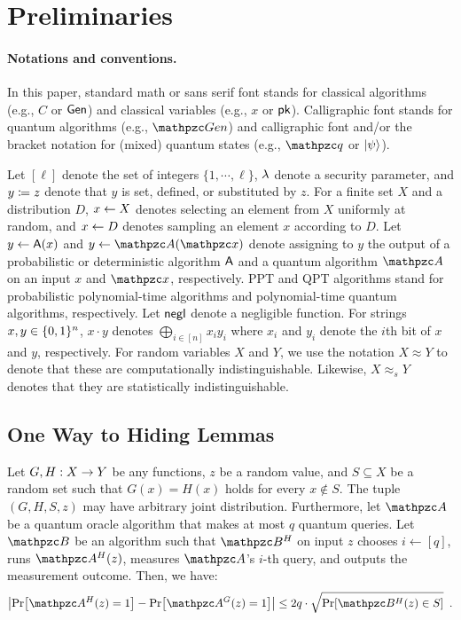 
\section{Preliminaries}\label{sec:prelim}
\ifnum{}
\else
\paragraph{Notations and conventions.}
In this paper, standard math or sans serif font stands for classical algorithms (e.g., $C$ or $\mathsf{Gen}$) and classical variables (e.g., $x$ or $\mathsf{pk}$).
Calligraphic font stands for quantum algorithms (e.g., $\qalgo{Gen}$) and calligraphic font and/or the bracket notation for (mixed) quantum states (e.g., $\qstate{q}$ or $\ket{\psi}$).

Let $[\ell]$ denote the set of integers $\{1, \cdots, \ell \}$, $\lambda$ denote a security parameter, and $y \coloneqq z$ denote that $y$ is set, defined, or substituted by $z$.
For a finite set $X$ and a distribution $D$, $x \leftarrow X$ denotes selecting an element from $X$ uniformly at random, and $x \leftarrow D$ denotes sampling an element $x$ according to $D$. Let $y \leftarrow \mathsf{A}(x)$ and $y \gets \qalgo{A}(\qstate{x})$ denote assigning to $y$ the output of a probabilistic or deterministic algorithm $\mathsf{A}$ and a quantum algorithm $\qalgo{A}$ on an input $x$ and $\qstate{x}$, respectively.
PPT and QPT algorithms stand for probabilistic polynomial-time algorithms and polynomial-time quantum algorithms, respectively.
Let ${\mathsf{negl}}$ denote a negligible function.
For strings $x,y\in \{0,1\}^n$, $x\cdot y$ denotes $\bigoplus_{i\in[n]} x_i y_i$ where $x_i$ and $y_i$ denote the $i$th bit of $x$ and $y$, respectively.
For random variables $X$ and $Y$, we use the notation $X \approx Y$ to denote that these are computationally indistinguishable. Likewise, $X \approx_s Y$ denotes that they are statistically indistinguishable.
\fi


\subsection{One Way to Hiding Lemmas}


\begin{lemma}\label{lem:O2Hprev}
Let $G,H:X\rightarrow Y$ be any functions, $z$ be a random value, and $S\subseteq X$ be a random set such that $G(x)=H(x)$ holds for every $x\notin S$.
The tuple $(G,H,S,z)$ may have arbitrary joint distribution.
Furthermore, let $\qA$ be a quantum oracle algorithm that makes at most $q$ quantum queries.
Let $\qB$ be an algorithm such that $\qB^H$ on input $z$ chooses $i\gets[q]$, runs $\qA^H(z)$, measures $\qA$'s $i$-th query, and outputs the measurement outcome.
Then, we have:
\begin{align}
\abs{\Pr[\qA^{H}(z)=1]-\Pr[\qA^{G}(z)=1]} \leq 2q\cdot\sqrt{\Pr[\qB^{H}(z)\in S]}
\enspace.
\end{align}
\end{lemma}

